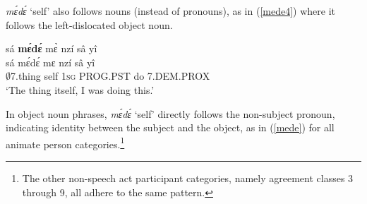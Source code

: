 {\itshape mɛ́dɛ́} `self' also follows nouns (instead of pronouns), as in (\ref{mede4}) where it follows the left-dislocated object noun.


\begin{exe} 
\ex\label{mede4}
  \glll sá {\bfseries mɛ́dɛ́} mɛ̀ nzí sâ yî \\
        sá mɛ́dɛ́ mɛ nzí sâ yî \\
        $\emptyset$7.thing self 1\textsc{sg} PROG.PST do 7.DEM.PROX \\
    \trans `The thing itself, I was doing this.'
\end{exe}


In object noun phrases, {\itshape mɛ́dɛ́} `self' directly follows the non-subject pronoun, indicating identity between the subject and the object, as in (\ref{mede}) for all animate person categories.\footnote{The other non-speech act participant categories, namely agreement classes 3 through 9, all adhere to the same pattern.}

